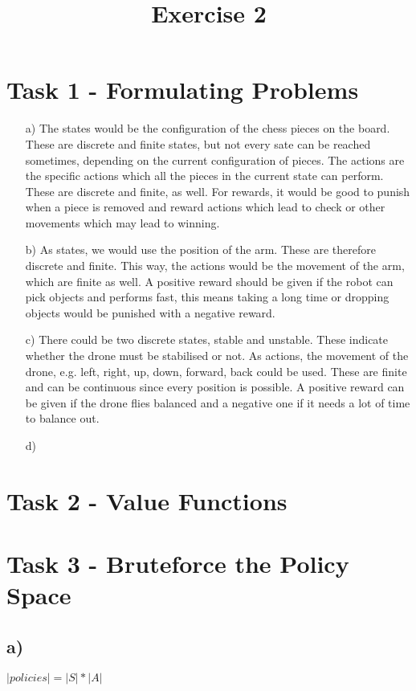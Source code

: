 \documentclass[a4paper]{article}
\date{}
\author{}
\title{\textbf{Exercise 2}}
\begin{document}
\maketitle 
\thispagestyle{fancy}

\section*{Task 1 - Formulating Problems}

\begin{enumerate}
	\item[a)] 
	The states would be the configuration of the chess pieces on the board. 
	These are discrete and finite states, but not every sate can be reached sometimes, depending on the current configuration of pieces.
	The actions are the specific actions which all the pieces in the current state can perform. 
	These are discrete and finite, as well. 
	For rewards, it would be good to punish when a piece is removed and reward actions which lead to check or other movements which may lead to winning.
	\item[b)] 
	As states, we would use the position of the arm. 
	These are therefore discrete and finite.
	This way, the actions would be the movement of the arm, which are finite as well. 
	A positive reward should be given if the robot can pick objects and performs fast, this means taking a long time or dropping objects would be punished with a negative reward. 
	\item[c)] 
	There could be two discrete states, stable and unstable. 
	These indicate whether the drone must be stabilised or not. 
	As actions, the movement of the drone, e.g. left, right, up, down, forward, back could be used. 
	These are finite and can be continuous since every position is possible. 
	A positive reward can be given if the drone flies balanced and a negative one if it needs a lot of time to balance out. 
	\item[d)] 
	
\end{enumerate}

\section*{Task 2 - Value Functions}

\section*{Task 3 - Bruteforce the Policy Space}
\subsection*{a)}
$ |policies|  =  |S| * |A| $
\end{document}
